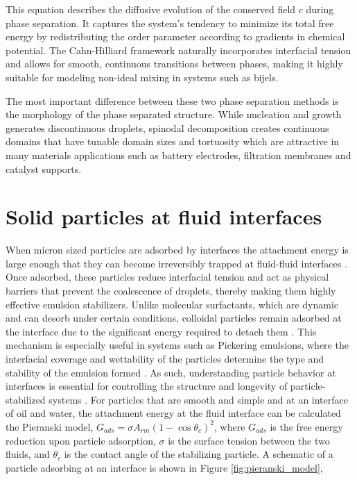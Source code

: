 This equation describes the diffusive evolution of the conserved field $c$ during phase separation. It captures the system's tendency to minimize its total free energy 
by redistributing the order parameter according to gradients in chemical potential. The Cahn-Hilliard framework naturally incorporates interfacial tension and allows for smooth, 
continuous transitions between phases, making it highly suitable for modeling non-ideal mixing in systems such as bijels.

The most important difference between these two phase separation methods is the morphology of the phase separated structure. While nucleation and growth generates discontinuous droplets,
spinodal decomposition creates continuous domains that have tunable domain sizes and tortuosity which are attractive in many materials applications such as battery electrodes, filtration
membranes and catalyst supports.

\section{Solid particles at fluid interfaces}

When micron sized particles are adsorbed by interfaces the attachment energy is large enough that they can become irreversibly trapped at fluid-fluid interfaces \cite{ngai_particle-stabilized_2015}. 
Once adsorbed, these 
particles reduce interfacial tension and act as physical barriers that prevent the coalescence of droplets, thereby making them highly effective emulsion stabilizers. Unlike molecular surfactants, 
which are dynamic and can desorb under certain conditions, colloidal particles remain adsorbed at the interface due to the significant energy required to detach them \cite{ngai_particle-stabilized_2015}. 
This mechanism 
is especially useful in systems such as Pickering emulsions, where the interfacial coverage and wettability of the particles determine the type and stability of the emulsion formed 
\cite{ngai_particle-stabilized_2015,velankar_non-equilibrium_2015}.
As such, understanding particle behavior at interfaces is essential for controlling the structure and longevity of particle-stabilized systems \cite{ngai_particle-stabilized_2015}. 
For particles that are smooth and simple and at an interface of oil and water, the attachment energy at the fluid interface can be calculated the Pieranski model, 
$G_{ads} = \sigma A_{rm} (1 - \cos{\theta_c})^2$, where $G_{ads}$ is the free energy reduction upon particle adsorption, $\sigma$ is the surface tension between the two 
fluids, and $\theta_c$ is the contact angle of the stabilizing particle. A schematic of a particle adsorbing at an interface is shown in Figure \ref{fig:pieranski_model},

